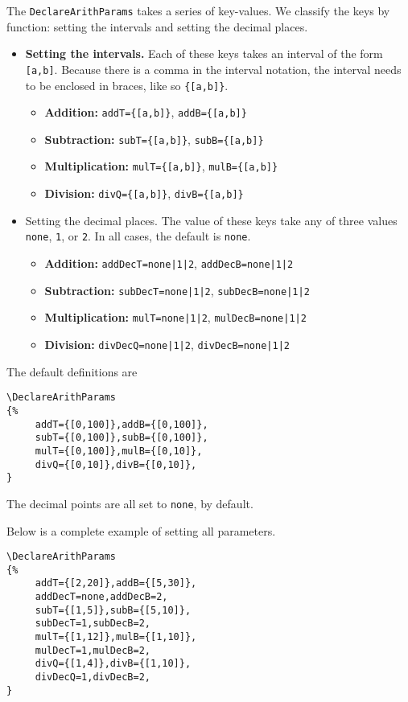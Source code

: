 \documentclass{article}
\makeatletter
\let\bslash=\@backslashchar
\def\cs#1{\texttt{\bslash#1}}
\makeatother
\begin{document}
The \cs{DeclareArithParams} takes a series of key-values. We classify the
keys by function: setting the intervals and setting the decimal places.
\begin{itemize}
    \item \textbf{Setting the intervals.} Each of these keys takes an
        interval of the form \texttt{[a,b]}. Because there is a comma in the
        interval notation, the interval needs to be enclosed in braces, like
        so \verb!{[a,b]}!.
    \begin{itemize}
        \item \textbf{Addition:} \verb!addT={[a,b]}!, \verb!addB={[a,b]}!
        \item \textbf{Subtraction:} \verb!subT={[a,b]}!, \verb!subB={[a,b]}!
        \item \textbf{Multiplication:} \verb!mulT={[a,b]}!, \verb!mulB={[a,b]}!
        \item \textbf{Division:} \verb!divQ={[a,b]}!, \verb!divB={[a,b]}!
    \end{itemize}
    \item {Setting the decimal places.} The value of these keys take any
        of three values \texttt{none}, \texttt{1}, or \texttt{2}. In all
        cases, the default is \texttt{none}.
    \begin{itemize}
        \item \textbf{Addition:} \verb!addDecT=none|1|2!, \verb!addDecB=none|1|2!
        \item \textbf{Subtraction:} \verb!subDecT=none|1|2!, \verb!subDecB=none|1|2!
        \item \textbf{Multiplication:} \verb!mulT=none|1|2!, \verb!mulDecB=none|1|2!
        \item \textbf{Division:} \verb!divDecQ=none|1|2!, \verb!divDecB=none|1|2!
    \end{itemize}
\end{itemize}

The default definitions are
\begin{Verbatim}[xleftmargin=\amtIndent]
\DeclareArithParams
{%
     addT={[0,100]},addB={[0,100]},
     subT={[0,100]},subB={[0,100]},
     mulT={[0,100]},mulB={[0,10]},
     divQ={[0,10]},divB={[0,10]},
}
\end{Verbatim}
The decimal points are all set to \texttt{none}, by default.

\newtopic\noindent Below is a complete example of setting all parameters.
\begin{Verbatim}[xleftmargin=\amtIndent]
\DeclareArithParams
{%
     addT={[2,20]},addB={[5,30]},
     addDecT=none,addDecB=2,
     subT={[1,5]},subB={[5,10]},
     subDecT=1,subDecB=2,
     mulT={[1,12]},mulB={[1,10]},
     mulDecT=1,mulDecB=2,
     divQ={[1,4]},divB={[1,10]},
     divDecQ=1,divDecB=2,
}
\end{Verbatim}
\end{document}
